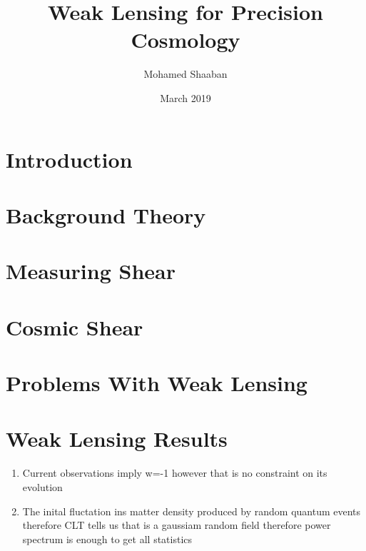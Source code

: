 \documentclass{article}
\title{Weak Lensing for Precision Cosmology}
\author{Mohamed Shaaban}
\date{March 2019}
\begin{document}
\maketitle

\section{Introduction}


\section{Background Theory}


\section{Measuring Shear}

\section{Cosmic Shear}
\cite{lensingbook} \cite{rachel_2018} \cite{hoekstra}

\section{Problems With Weak Lensing}
\cite{massey_2013}

\section{Weak Lensing Results}
\cite{Subaru_2019}

\begin{enumerate}
    \item Current observations imply w=-1 however that is no constraint on its evolution
    \item The inital fluctation ins matter density produced by random quantum events therefore CLT tells us that is a gaussiam random field therefore power spectrum is enough to get all statistics
\end{enumerate}



\end{document}
